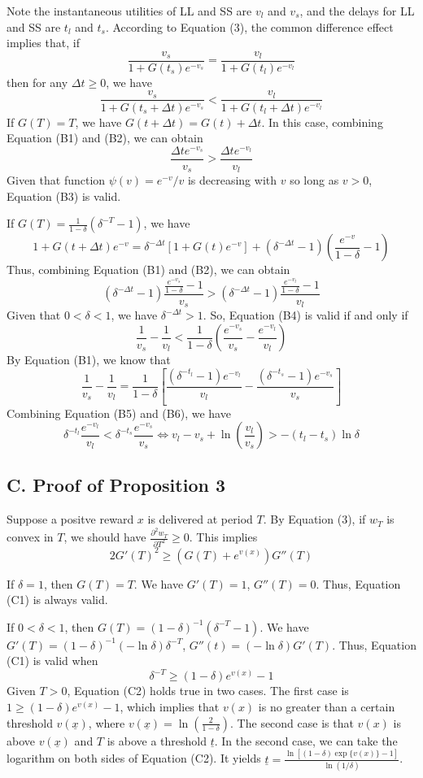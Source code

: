 \documentclass[
  12pt,
]{article}
\begin{document}
Note the instantaneous utilities of LL and SS are \(v_l\) and \(v_s\),
and the delays for LL and SS are \(t_l\) and \(t_s\). According to
Equation (3), the common difference effect implies that, if\[ \tag{B1}
\frac{v_s}{1+G(t_s)e^{-v_s}} = \frac{v_l}{1+G(t_l)e^{-v_l}}
\]then for any \(\Delta t \geq 0\), we have \[ \tag{B2}
\frac{v_s}{1+G(t_s+\Delta t)e^{-v_s}} < \frac{v_l}{1+G(t_l+\Delta t)e^{-v_l}}
\]If \(G(T)=T\), we have \(G(t+\Delta t) = G(t) + \Delta t\). In this
case, combining Equation (B1) and (B2), we can obtain\[ \tag{B3}
\frac{\Delta t e^{-v_s}}{v_s} > \frac{\Delta t e^{-v_l}}{v_l}
\]Given that function \(\psi(v) = e^{-v}/v\) is decreasing with \(v\) so
long as \(v>0\), Equation (B3) is valid.

If \(G(T) = \frac{1}{1-\delta}(\delta^{-T}-1)\), we have\[
1+G(t+\Delta t)e^{-v} = \delta^{-\Delta t}[1+G(t)e^{-v}]+(\delta^{-\Delta t}-1)(\frac{e^{-v}}{1-\delta}-1)
\] Thus, combining Equation (B1) and (B2), we can obtain\[\tag{B4}
(\delta^{-\Delta t}-1)\frac{\frac{e^{-v_s}}{1-\delta}-1}{v_s} >
(\delta^{-\Delta t}-1)\frac{\frac{e^{-v_l}}{1-\delta}-1}{v_l}
\] Given that \(0<\delta<1\), we have \(\delta^{-\Delta t}>1\). So,
Equation (B4) is valid if and only if\[\tag{B5}
\frac{1}{v_s}-\frac{1}{v_l}<\frac{1}{1-\delta}(\frac{e^{-v_s}}{v_s}-\frac{e^{-v_l}}{v_l})
\] By Equation (B1), we know that\[\tag{B6}
\frac{1}{v_s}-\frac{1}{v_l}=\frac{1}{1-\delta}\left[\frac{(\delta^{-t_l}-1)e^{-v_l}}{v_l} -\frac{(\delta^{-t_s}-1)e^{-v_s}}{v_s}\right]
\] Combining Equation (B5) and (B6), we have\[
\delta^{-t_l}\frac{e^{-v_l}}{v_l}<\delta^{-t_s}\frac{e^{-v_s}}{v_s} \Longleftrightarrow v_l - v_s + \ln \left(\frac{v_l}{v_s}\right)>-(t_l-t_s)\ln\delta
\]

\hypertarget{c.-proof-of-proposition-3}{%
\subsection*{C. Proof of Proposition
3}\label{c.-proof-of-proposition-3}}

Suppose a positve reward \(x\) is delivered at period \(T\). By Equation
(3), if \(w_T\) is convex in \(T\), we should have
\(\frac{\partial^2 w_T}{\partial T^2}\geq 0\). This
implies\[\tag{C1} 2G'(T)^2\geq(G(T)+e^{v(x)})G''(T) \]

If \(\delta=1\), then \(G(T)=T\). We have \(G'(T)=1\), \(G''(T)=0\).
Thus, Equation (C1) is always valid.

If \(0<\delta<1\), then \(G(T)=(1-\delta)^{-1}(\delta^{-T}-1)\). We have
\(G'(T)=(1-\delta)^{-1}(-\ln\delta)\delta^{-T}\),
\(G''(t)=(-\ln\delta)G'(T)\). Thus, Equation (C1) is valid when
\[\tag{C2} \delta^{-T}\geq(1-\delta)e^{v(x)}-1 \]Given \(T>0\), Equation
(C2) holds true in two cases. The first case is
\(1\geq (1-\delta)e^{v(x)}-1\), which implies that \(v(x)\) is no
greater than a certain threshold \(v(\underline{x})\), where
\(v(\underline{x})=\ln(\frac{2}{1-\delta})\). The second case is that
\(v(x)\) is above \(v(\underline{x})\) and \(T\) is above a threshold
\(\underline{t}\). In the second case, we can take the logarithm on both
sides of Equation (C2). It yields
\(\underline{t}=\frac{\ln[(1-\delta)\exp\{v(x)\}-1]}{\ln(1/\delta)}\).
\end{document}
